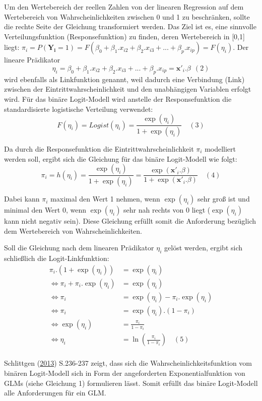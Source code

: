 \documentclass[12pt,]{article}
\begin{document}
Um den Wertebereich der reellen Zahlen von der linearen Regression auf
dem Wertebereich von Wahrscheinlichkeiten zwischen 0 und 1 zu
beschränken, sollte die rechte Seite der Gleichung transformiert werden.
Das Ziel ist es, eine sinnvolle Verteilungsfunktion (Responsefunktion)
zu finden, deren Wertebereich in {[}0,1{]} liegt:
\(\pi_i = P(\mathbf{Y_i} = 1) = F(\beta_0 + \beta_1.x_{i2} + \beta_2.x_{i3} + ... + \beta_p.x_{ip}) = F(\eta_i)\).
Der lineare Prädikator
\[\eta_i = \beta_0 + \beta_1.x_{i2} + \beta_2.x_{i3} + ... + \beta_p.x_{ip} = \mathbf{x'}_i.\beta \ \ (2)\]
wird ebenfalls als Linkfunktion genannt, weil dadurch eine Verbindung
(Link) zwischen der Eintrittwahrscheinlichkeit und den unabhängigen
Variablen erfolgt wird. Für das binäre Logit-Modell wird anstelle der
Responsefunktion die standardisierte logistische Verteilung verwendet:
\[
F(\eta_i) = Logist(\eta_i) = \frac{\exp(\eta_i)}{1 + \exp(\eta_i)} \quad (3)
\]

Da durch die Responsefunktion die Eintrittwahrscheinlichkeit \(\pi_i\)
modelliert werden soll, ergibt sich die Gleichung für das binäre
Logit-Modell wie folgt: \[
\pi_i = h(\eta_i) = \frac{\exp(\eta_i)}{1 + \exp(\eta_i)} = \frac{\exp(\mathbf{x'}_i.\beta)}{1+\exp(\mathbf{x'}_i.\beta)} \quad (4)
\]

Dabei kann \(\pi_i\) maximal den Wert 1 nehmen, wenn \(\exp(\eta_i)\)
sehr groß ist und minimal den Wert 0, wenn \(\exp(\eta_i)\) sehr nah
rechts von 0 liegt (\(\exp(\eta_i)\) kann nicht negativ sein). Diese
Gleichung erfüllt somit die Anforderung bezüglich dem Wertebereich von
Wahrscheinlichkeiten.

Soll die Gleichung nach dem linearen Prädikator \(\eta_i\) gelöst
werden, ergibt sich schließlich die Logit-Linkfunktion: \[
\begin{aligned}
\pi_i.(1 + \exp(\eta_i)) &= \exp(\eta_i) \\
\Leftrightarrow \pi_i + \pi_i.\exp(\eta_i) &= \exp(\eta_i) \\
\Leftrightarrow \pi_i &= \exp(\eta_i) - \pi_i.\exp(\eta_i)  \\
\Leftrightarrow \pi_i &= \exp(\eta_i).(1-\pi_i) \\
\Leftrightarrow \exp(\eta_i) &= \frac{\pi_i}{1-\pi_i} \\
\Leftrightarrow \eta_i &= \ln(\frac{\pi_i}{1-\pi_i}) \quad (5)\\
\end{aligned} 
\]

Schlittgen
(\protect\hyperlink{ref-schlittgen2013regressionsanalysen}{2013})
S.236-237 zeigt, dass sich die Wahrscheinlichkeitsfunktion vom binären
Logit-Modell sich in Form der angeforderten Exponentialfunktion von GLMs
(siehe Gleichung 1) formulieren lässt. Somit erfüllt das binäre
Logit-Modell alle Anforderungen für ein GLM.
\end{document}
